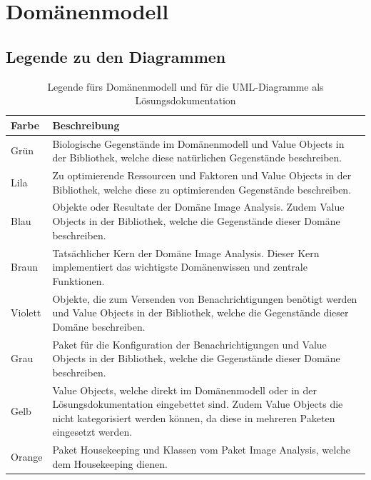


\section{Domänenmodell}
\subsection{Legende zu den Diagrammen}
\begin{table}[H]
	\centering	
	
	\begin{tabular}{ p{2cm}  p{12cm}  }
		
		\toprule[1pt]
		\rowcolor{maroon!30}	
		Farbe & Beschreibung \\
		
		\midrule
Grün \cellcolor[RGB]{204,235,197}&  Biologische Gegenstände im Domänenmodell und Value Objects in der Bibliothek, welche diese natürlichen Gegenstände beschreiben. \\
Lila \cellcolor[RGB]{253,218,236} & Zu optimierende Ressourcen und Faktoren und Value Objects in der Bibliothek,  welche diese zu optimierenden Gegenstände beschreiben.\\
Blau\cellcolor[RGB]{179,205,227} &  Objekte oder Resultate der Domäne \flqq{}Image Analysis\frqq{}. Zudem Value Objects in der Bibliothek, welche die Gegenstände dieser Domäne beschreiben. \\
Braun \cellcolor[RGB]{229,216,189}& Tatsächlicher Kern der Domäne \flqq{}Image Analysis\frqq{}. Dieser Kern implementiert das wichtigste Domänenwissen und zentrale Funktionen.\\			
Violett \cellcolor[RGB]{222,203,228} & Objekte, die zum Versenden von Benachrichtigungen benötigt werden und Value Objects in der Bibliothek, welche die Gegenstände dieser Domäne beschreiben.\\
Grau\cellcolor[RGB]{242,242,242} &  Paket für die Konfiguration der Benachrichtigungen und Value Objects in der Bibliothek, welche die Gegenstände dieser Domäne beschreiben.\\		
Gelb \cellcolor[RGB]{255,255,204}& Value Objects, welche direkt im Domänenmodell oder in der Lösungsdokumentation eingebettet sind. Zudem Value Objects die nicht kategorisiert werden können, da diese in mehreren Paketen eingesetzt werden. \\		
Orange \cellcolor[RGB]{254,217,166} &  Paket Housekeeping und Klassen vom Paket \flqq{}Image Analysis\frqq{}, welche dem Housekeeping dienen. \\
		
		\bottomrule
		
	\end{tabular}
	\caption{Legende fürs Domänenmodell und für die UML-Diagramme als Lösungsdokumentation}
	\label{tab: Legende fürs Domänenmodell und für die UML-Diagramme als Lösungsdokumentation}
\end{table}

